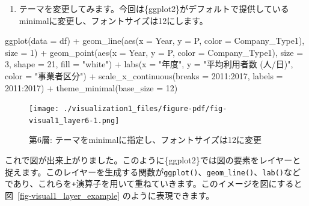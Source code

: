 \documentclass[
  a4paper,
  pandoc,
  ja=standard,
  jafont=haranoaji]{bxjsbook}
\newenvironment{Shaded}{\begin{snugshade}}{\end{snugshade}}
\newcommand{\AttributeTok}[1]{\textcolor[rgb]{0.00,0.48,0.65}{#1}}
\newcommand{\DecValTok}[1]{\textcolor[rgb]{0.68,0.00,0.00}{#1}}
\newcommand{\FunctionTok}[1]{\textcolor[rgb]{0.28,0.35,0.67}{#1}}
\newcommand{\NormalTok}[1]{\textcolor[rgb]{0.00,0.48,0.65}{#1}}
\newcommand{\SpecialCharTok}[1]{\textcolor[rgb]{0.37,0.37,0.37}{#1}}
\newcommand{\StringTok}[1]{\textcolor[rgb]{0.13,0.47,0.30}{#1}}
\providecommand{\tightlist}{%
  \setlength{\itemsep}{0pt}\setlength{\parskip}{0pt}}
\begin{document}
\begin{enumerate}
\def\labelenumi{\arabic{enumi}.}
\setcounter{enumi}{5}
\tightlist
\item
  テーマを変更してみます。今回は\{ggplot2\}がデフォルトで提供しているminimalに変更し、フォントサイズは12にします。
\end{enumerate}

\begin{Shaded}
\begin{Highlighting}[numbers=left,,]
\FunctionTok{ggplot}\NormalTok{(}\AttributeTok{data =}\NormalTok{ df) }\SpecialCharTok{+}
  \FunctionTok{geom\_line}\NormalTok{(}\FunctionTok{aes}\NormalTok{(}\AttributeTok{x =}\NormalTok{ Year, }\AttributeTok{y =}\NormalTok{ P, }\AttributeTok{color =}\NormalTok{ Company\_Type1), }
            \AttributeTok{size =} \DecValTok{1}\NormalTok{) }\SpecialCharTok{+}
  \FunctionTok{geom\_point}\NormalTok{(}\FunctionTok{aes}\NormalTok{(}\AttributeTok{x =}\NormalTok{ Year, }\AttributeTok{y =}\NormalTok{ P, }\AttributeTok{color =}\NormalTok{ Company\_Type1), }
             \AttributeTok{size =} \DecValTok{3}\NormalTok{, }\AttributeTok{shape =} \DecValTok{21}\NormalTok{, }\AttributeTok{fill =} \StringTok{"white"}\NormalTok{) }\SpecialCharTok{+}
  \FunctionTok{labs}\NormalTok{(}\AttributeTok{x =} \StringTok{"年度"}\NormalTok{, }\AttributeTok{y =} \StringTok{"平均利用者数 (人/日)"}\NormalTok{, }\AttributeTok{color =} \StringTok{"事業者区分"}\NormalTok{) }\SpecialCharTok{+}
  \FunctionTok{scale\_x\_continuous}\NormalTok{(}\AttributeTok{breaks =} \DecValTok{2011}\SpecialCharTok{:}\DecValTok{2017}\NormalTok{, }\AttributeTok{labels =} \DecValTok{2011}\SpecialCharTok{:}\DecValTok{2017}\NormalTok{) }\SpecialCharTok{+}
  \FunctionTok{theme\_minimal}\NormalTok{(}\AttributeTok{base\_size =} \DecValTok{12}\NormalTok{)}
\end{Highlighting}
\end{Shaded}

\begin{figure}[H]

{\centering \texttt{[image: ./visualization1\_files/figure-pdf/fig-visual1\_layer6-1.png]}

}

\caption{\label{fig-visual1_layer6}第6層:
テーマをminimalに指定し、フォントサイズは12に変更}

\end{figure}

これで図が出来上がりました。このように\{ggplot2\}では図の要素をレイヤーと捉えます。このレイヤーを生成する関数が\texttt{ggplot()}、\texttt{geom\_line()}、\texttt{lab()}などであり、これらを\texttt{+}演算子を用いて重ねていきます。このイメージを図にすると
図~\ref{fig-visual1_layer_example} のように表現できます。
\end{document}
